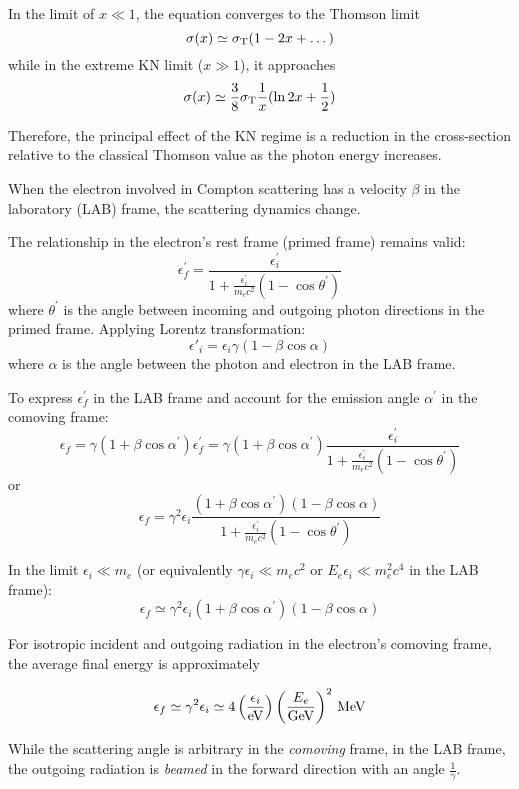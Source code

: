 In the limit of \( x \ll 1 \), the equation converges to the Thomson limit \[ \sigma(x) \simeq \sigma_{\rm T} (1-2x+\dots) \] while in the extreme KN limit (\( x \gg 1 \)), it approaches \[ \sigma(x) \simeq \frac{3}{8} \sigma_{\rm T} \frac{1}{x} (\ln 2x + \frac{1}{2}) \]

Therefore, the principal effect of the KN regime is a reduction in the cross-section relative to the classical Thomson value as the photon energy increases.


When the electron involved in Compton scattering has a velocity \( \beta \) in the laboratory (LAB) frame, the scattering dynamics change.

The relationship in the electron's rest frame (primed frame) remains valid:
%
\[
\epsilon^\prime_f = \frac{\epsilon^\prime_i}{1+ \frac{\epsilon^\prime_i}{m_e c^2} (1-\cos\theta^\prime)}
\]
%
where \( \theta^\prime \) is the angle between incoming and outgoing photon directions in the primed frame. Applying Lorentz transformation:
%
\[
\epsilon'_i = \epsilon_i \gamma (1-\beta \cos \alpha)
\]
%
where \( \alpha \) is the angle between the photon and electron in the LAB frame.

To express \( \epsilon^\prime_f \) in the LAB frame and account for the emission angle \( \alpha^\prime \) in the comoving frame:
%
\[
\epsilon_f = \gamma(1+\beta \cos\alpha^\prime) \epsilon^\prime_f = 
\gamma (1+\beta \cos \alpha^\prime) \frac{\epsilon^\prime_i}{1+ \frac{\epsilon^\prime_i}{m_e c^2} (1-\cos\theta^\prime)}
\]
%
or
\[
\epsilon_f = \gamma^2 \epsilon_i \frac{(1+\beta \cos\alpha^\prime)(1-\beta \cos\alpha)}{1+ \frac{\epsilon^\prime_i}{m_e c^2} (1-\cos\theta^\prime)}
\]

In the limit \( \epsilon_i \ll m_e \) (or equivalently \( \gamma \epsilon_i \ll m_e c^2 \) or \( E_e \epsilon_i \ll m_e^2 c^4 \) in the LAB frame):
%
\[
\epsilon_f \simeq \gamma^2 \epsilon_i (1+\beta \cos\alpha^\prime)(1-\beta \cos\alpha)
\]

For isotropic incident and outgoing radiation in the electron's comoving frame, the average final energy is approximately 
%
\begin{remark}
\[
 \epsilon_f \simeq \gamma^2 \epsilon_i \simeq 4 \left(\frac{\epsilon_i}{\rm eV}\right)\left(\frac{E_e}{\rm GeV}\right)^2 \, \text{MeV}   
\]
\end{remark}

While the scattering angle is arbitrary in the \emph{comoving} frame, in the LAB frame, the outgoing radiation is \emph{beamed} in the forward direction with an angle \( \frac{1}{\gamma} \).

